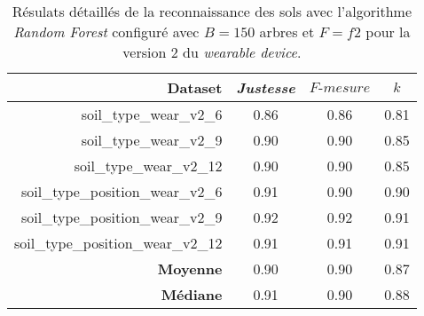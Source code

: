 \begin{table}[H]\renewcommand{\arraystretch}{0.5}
	\centering
	\caption{Résulats détaillés de la reconnaissance des sols avec l'algorithme \textit{Random Forest} configuré avec $B=150$ arbres et $F=f2$ pour la version 2 du \textit{wearable device}.}
	\label{tab:tab:rf-150-f2-wear-v2}
	\begin{tabular}{@{}rccc@{}}
		\toprule
			\textbf{Dataset} & \textit{Justesse} & $F\mbox{-} mesure$ & \textbf{$k$} \\
		\midrule
			soil\_type\_wear\_v2\_6 & 0.86 & 0.86 & 0.81 \\
			soil\_type\_wear\_v2\_9 & 0.90 & 0.90 & 0.85 \\
			soil\_type\_wear\_v2\_12 & 0.90 & 0.90 & 0.85 \\
			soil\_type\_position\_wear\_v2\_6 & 0.91 & 0.90 & 0.90 \\
			soil\_type\_position\_wear\_v2\_9 & 0.92 & 0.92 & 0.91 \\
			soil\_type\_position\_wear\_v2\_12 & 0.91 & 0.91 & 0.91 \\
			\textbf{Moyenne} & 0.90 & 0.90 & 0.87 \\
			\textbf{Médiane} & 0.91 & 0.90 & 0.88 \\
		\bottomrule
	\end{tabular}
\end{table}

